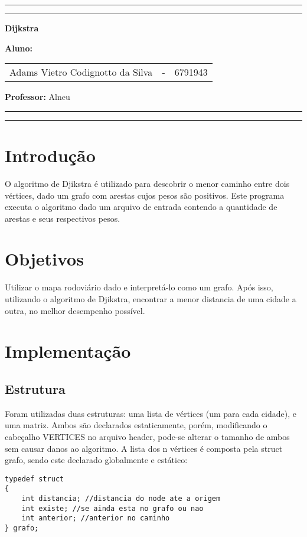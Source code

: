 \documentclass[10pt,a4paper]{article}
\begin{document}
\onehalfspace

\thispagestyle{empty}
\hrule \vspace{0.4pc} \hrule
\bigskip
\begin{center}
 {\Large  \textbf{Dijkstra}}
\end{center}


\begin{center}
	\large{ \textbf{Aluno:}  \begin{tabular}{ccc}
							Adams Vietro Codignotto da Silva  & - & 6791943\\ 
					 \end{tabular} 
		\vspace{0.2cm}
		
	\textbf{Professor:} { Alneu} }
		\vspace{0.2cm}
		
	 \end{center}
\bigskip
\hrule \vspace{0.4pc} \hrule

\newpage


\section{Introdução}

O algoritmo de Djikstra é utilizado para descobrir o menor caminho entre dois vértices, dado um grafo com arestas cujos pesos são positivos. Este programa executa o algoritmo dado um arquivo de entrada contendo a quantidade de arestas e seus respectivos pesos.

\section{Objetivos}

Utilizar o mapa rodoviário dado e interpretá-lo como um grafo. Após isso, utilizando o algoritmo de Djikstra, encontrar a menor distancia de uma cidade a outra, no melhor desempenho possível.

\section{Implementação}

\subsection{Estrutura}
Foram utilizadas duas estruturas: uma lista de vértices (um para cada cidade), e uma matriz. Ambos são declarados estaticamente, porém, modificando o cabeçalho VERTICES no arquivo header, pode-se alterar o tamanho de ambos sem causar danos ao algoritmo.
A lista dos n vértices é composta pela struct grafo, sendo este declarado globalmente e estático:
\begin{lstlisting}
typedef struct
{
    int distancia; //distancia do node ate a origem
    int existe; //se ainda esta no grafo ou nao
    int anterior; //anterior no caminho
} grafo;
\end{lstlisting}
\end{document}
